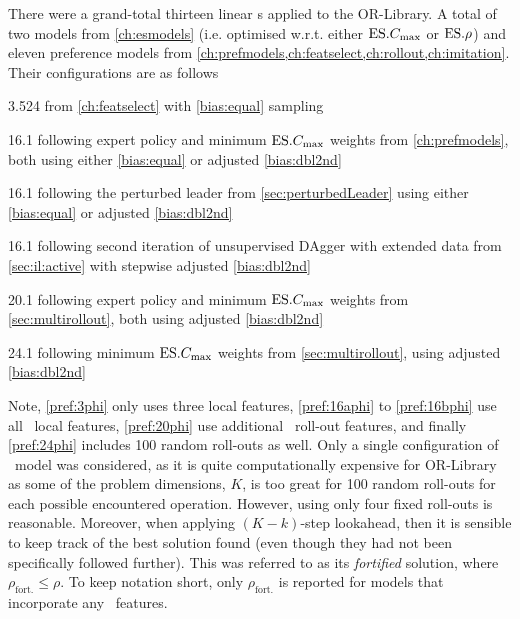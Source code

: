 There were a grand-total thirteen linear \cdr s applied to the OR-Library. 
A total of two models from \cref{ch:esmodels} (i.e. optimised w.r.t. either 
$\text{ES}.{C_{\max}}$ or $\text{ES}.{\rho}$) and eleven preference models from 
\cref{ch:prefmodels,ch:featselect,ch:rollout,ch:imitation}.
Their configurations are as follows
\begin{enumerate*}
    \item \label{pref:3phi} 3.524 from \cref{ch:featselect} with 
    \ref{bias:equal} sampling
    \item \label{pref:16aphi} 16.1 following expert policy and minimum 
    $\text{ES}.{C_{\max}}$ weights from \cref{ch:prefmodels}, both using either 
    \ref{bias:equal} or adjusted \ref{bias:dbl2nd}
    \item 16.1 following the perturbed leader from \cref{sec:perturbedLeader}  
    using either \ref{bias:equal} or adjusted \ref{bias:dbl2nd}
    \item \label{pref:16bphi} 16.1 following second iteration of unsupervised 
    DAgger with extended data from \cref{sec:il:active} with stepwise adjusted 
    \ref{bias:dbl2nd}
    \item \label{pref:20phi} 20.1 following expert policy and minimum 
    $\text{ES}.{C_{\max}}$ weights from \cref{sec:multirollout}, both using adjusted 
    \ref{bias:dbl2nd}
    \item \label{pref:24phi} 24.1 following minimum $\text{ES}.{C_{\max}}$ weights from 
    \cref{sec:multirollout}, using adjusted \ref{bias:dbl2nd}
\end{enumerate*} 
Note, \ref{pref:3phi} only uses three local features, \ref{pref:16aphi} to 
\ref{pref:16bphi} use all \NrFeatLocal\ local features, \ref{pref:20phi} use 
additional \phiSDRRelated\ roll-out features, and finally \ref{pref:24phi} 
includes 100 random roll-outs as well.\linebreak
Only a single configuration of \phiRNDRelated\ model was considered, as it is 
quite computationally expensive for OR-Library as some of the problem 
dimensions, $K$, is too great for 100 random roll-outs for each possible 
encountered operation. However, using only four fixed roll-outs is reasonable.
Moreover, when applying $(K-k)$-step lookahead, then it is sensible to keep 
track of the best solution found (even though they had not been specifically 
followed further). This was referred to as its \emph{fortified} solution, where 
$\rho_{\text{fort.}}\leq\rho$. To keep notation short, only 
$\rho_{\text{fort.}}$ is reported for models that incorporate any 
\phiGlobalRelated\ features. 
